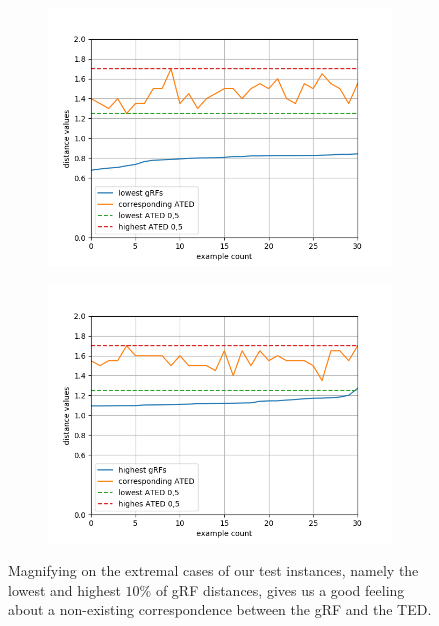 \begin{figure}[!ht]
	\centering	
	\begin{subfigure}[b]{0.45\textwidth}
		\includegraphics[width=\textwidth]{figures/low_grf_corr_ated.png}
	\end{subfigure}
	\quad
	\begin{subfigure}[b]{0.45\textwidth}
		\includegraphics[width=\textwidth]{figures/high_grf_corr_ated.png}
	\end{subfigure}
	\caption{Magnifying on the extremal cases of our test instances, namely the lowest and highest $10$\% of gRF distances, gives us a good feeling about a non-existing correspondence between the gRF and the TED.}
	\label{fig:low_high_grf_corr_ated}
\end{figure} 

